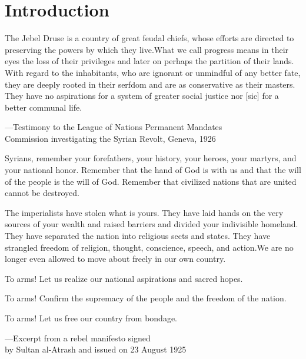 


\debugtitle
\chapter{Introduction}


\label{style43}

\epigraph{The Jebel Druse is a country of great feudal chiefs, whose efforts are
directed to preserving the powers by which they live.What we call
progress means in their eyes the loss of their privileges and later on
perhaps the partition of their lands. With regard to the inhabitants,
who are ignorant or unmindful of any better fate, they are deeply rooted
in their serfdom and are as conservative as their masters. They have no
aspirations for a system of greater social justice nor [sic] for a better
communal life.}{---Testimony to the League of Nations Permanent Mandates\\
Commission investigating the Syrian Revolt, Geneva, 1926}

\epigraph{Syrians, remember your forefathers, your history, your heroes, your
martyrs, and your national honor. Remember that the hand of God is
with us and that the will of the people is the will of God. Remember
that civilized nations that are united cannot be destroyed.

The imperialists have stolen what is yours. They have laid hands on
the very sources of your wealth and raised barriers and divided your
indivisible homeland. They have separated the nation into religious
sects and states. They have strangled freedom of religion, thought,
conscience, speech, and action.We are no longer even allowed to move
about freely in our own country.

To arms! Let us realize our national aspirations and sacred hopes.

To arms! Confirm the supremacy of the people and the freedom of
the nation.

To arms! Let us free our country from bondage.}{---Excerpt from a rebel manifesto signed\\ by Sultan
al-Atrash and issued on 23 August 1925}

